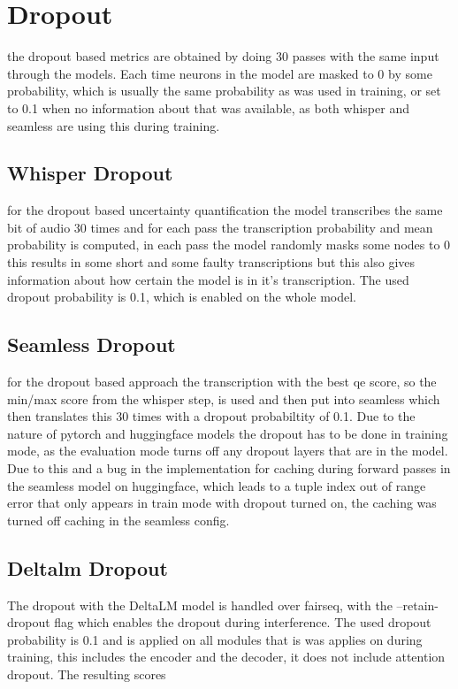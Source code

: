 \section{Dropout}\label{experiment:dropout}
the dropout based metrics are obtained by doing 30 passes with the same input through the models. 
Each time neurons in the model are masked to 0 by some probability, which is usually the same probability as was used in training, or set to 0.1 when no information about that was available, as both whisper and seamless are using this during training. 

\subsection{Whisper Dropout}
for the dropout based uncertainty quantification the model transcribes the same bit of audio 30 times and for each pass the transcription probability and mean probability is computed, in each pass the model randomly masks some nodes to 0
this results in some short and some faulty transcriptions but this also gives information about how certain the model is in it's transcription. The used dropout probability is 0.1, which is enabled on the whole model.


\subsection{Seamless Dropout}
for the dropout based approach the transcription with the best qe score, so the min/max score from the whisper step, is used 
and then put into seamless which then translates this 30 times with a dropout probabiltity of 0.1.
Due to the nature of pytorch and huggingface models the dropout has to be done in training mode, as the evaluation mode turns off any dropout layers that are in the model. Due to this and a bug in the implementation for caching during forward passes in the seamless model on huggingface, which leads to a tuple index out of range error that only appears in train mode with dropout turned on, the caching was turned off caching in the seamless config. 

\subsection{Deltalm Dropout}
The dropout with the DeltaLM model is handled over fairseq, with the --retain-dropout flag which enables the dropout during interference.
The used dropout probability is 0.1 and is applied on all modules that is was applies on during training, this includes the encoder and the decoder, it does not include attention dropout. 
The resulting scores

